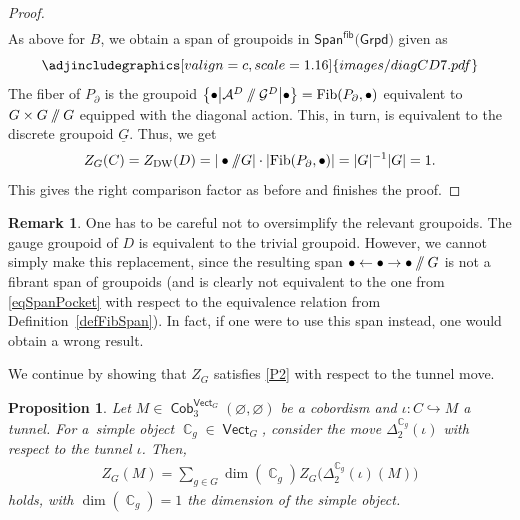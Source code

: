 \documentclass[10pt,a4paper]{amsart}
\DeclareMathOperator{\vect}{\mathsf{Vect}}
\DeclareMathOperator{\C}{\mathbb{C}}
\DeclareMathOperator{\Cob}{\mathsf{Cob}}
\newcommand{\sslash}{\mathbin{/\mkern-6mu/}}
\numberwithin{equation}{section}
\newtheorem{Proposition}[Proposition]{Proposition}
\theoremstyle{definition}
\newtheorem{Remark}[Remark]{Remark}
\begin{document}
\begin{proof}
\begin{align*}
 \end{align*}
 As above for $B$, we obtain a span of groupoids in $\mathsf{Span}^{\mathsf{fib}}(\mathsf{Grpd)}$ given as
 \[
 \centering
 \adjincludegraphics[valign=c, scale = 1.16]{images/diagCD7.pdf}
 \]
 The fiber of $P_{\partial}$ is the groupoid $\bigl\{\bullet \bigl| \mathcal{A}^{ D} \sslash \mathcal{G}^{ D} \bigr| \bullet\bigr\} = \mathrm{Fib}(P_{\partial}, \bullet)$ equivalent to $G \times G \sslash G$ equipped with the diagonal action. This, in turn, is equivalent to the discrete groupoid $\underline{G}$. Thus, we get
 \begin{align}\label{eqSpanPocket}
 Z_G(C) = Z_{\rm DW}(D) = |\bullet \sslash G| \cdot |\mathrm{Fib}(P_{\partial}, \bullet)| = |G|^{-1} |G| = 1.
 \end{align}
 This gives the right comparison factor as before and finishes the proof.
\end{proof}

\begin{Remark}One has to be careful not to oversimplify the relevant groupoids. The gauge groupoid of $D$ is equivalent to the trivial groupoid. However, we cannot simply make this replacement, since the resulting span $\bullet \leftarrow \bullet \rightarrow \bullet \sslash G$ is not a fibrant span of groupoids (and is clearly not equivalent to the one from \eqref{eqSpanPocket} with respect to the equivalence relation from Definition~\ref{defFibSpan}). In fact, if one were to use this span instead, one would obtain a wrong result.
\end{Remark}
We continue by showing that $Z_G$ satisfies \ref{P2} with respect to the tunnel move.

\begin{Proposition}\label{propDW2}
 Let $M \in \Cob_3^{\vect_G}(\varnothing, \varnothing)$ be a cobordism and $\iota\colon C \hookrightarrow M$ a tunnel. For a~simple object $\C_g \in \vect_G$, consider the move $\Delta_2^{\C_g}(\iota)$ with respect to the tunnel $\iota$. Then,
 \begin{align}
 \label{eqDWTun}
 Z_G(M) = \sum_{g \in G}\dim (\C_g)Z_G\bigl(\Delta_2^{\C_g}(\iota)(M)\bigr)
 \end{align}
 holds, with $\dim (\C_g) = 1$ the dimension of the simple object.
\end{Proposition}
\end{document}
